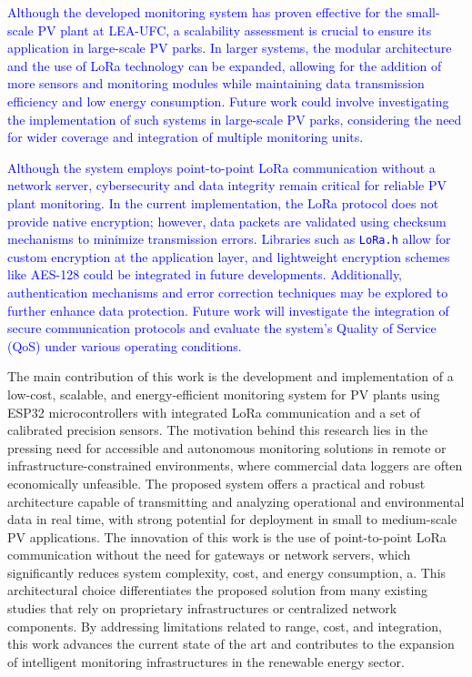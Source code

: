 \textcolor{blue}{
Although the developed monitoring system has proven effective for the small-scale PV plant at LEA-UFC, a scalability assessment is crucial to ensure its application in large-scale PV parks. In larger systems, the modular architecture and the use of LoRa technology can be expanded, allowing for the addition of more sensors and monitoring modules while maintaining data transmission efficiency and low energy consumption. Future work could involve investigating the implementation of such systems in large-scale PV parks, considering the need for wider coverage and integration of multiple monitoring units.
}

\textcolor{blue}{
Although the system employs point-to-point LoRa communication without a network server, cybersecurity and data integrity remain critical for reliable PV plant monitoring. In the current implementation, the LoRa protocol does not provide native encryption; however, data packets are validated using checksum mechanisms to minimize transmission errors. Libraries such as \texttt{LoRa.h} allow for custom encryption at the application layer, and lightweight encryption schemes like AES-128 could be integrated in future developments. Additionally, authentication mechanisms and error correction techniques may be explored to further enhance data protection. Future work will investigate the integration of secure communication protocols and evaluate the system's Quality of Service (QoS) under various operating conditions.
}



The main contribution of this work is the development and implementation of a low-cost, scalable, and energy-efficient monitoring system for PV plants using ESP32 microcontrollers with integrated LoRa communication and a set of calibrated precision sensors. The motivation behind this research lies in the pressing need for accessible and autonomous monitoring solutions in remote or infrastructure-constrained environments, where commercial data loggers are often economically unfeasible. The proposed system offers a practical and robust architecture capable of transmitting and analyzing operational and environmental data in real time, with strong potential for deployment in small to medium-scale PV applications. The innovation of this work is the use of point-to-point LoRa communication without the need for gateways or network servers, which significantly reduces system complexity, cost, and energy consumption, a. This architectural choice differentiates the proposed solution from many existing studies that rely on proprietary infrastructures or centralized network components. By addressing limitations related to range, cost, and integration, this work advances the current state of the art and contributes to the expansion of intelligent monitoring infrastructures in the renewable energy sector.
